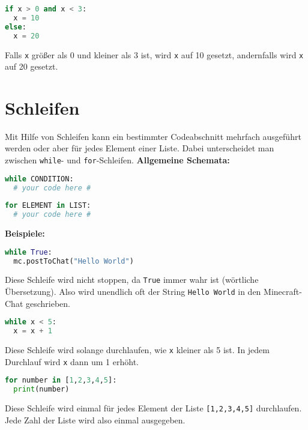 \documentclass{article}
\begin{document}
	\begin{lstlisting}[language=Python]
if x > 0 and x < 3:
  x = 10
else:
  x = 20
	\end{lstlisting}
	Falls \texttt{x} größer als 0 und kleiner als 3 ist, wird \texttt{x} auf 10 gesetzt, andernfalls wird \texttt{x} auf 20 gesetzt.
	
	\section{Schleifen}
	Mit Hilfe von Schleifen kann ein bestimmter Codeabschnitt mehrfach ausgeführt werden oder aber für jedes Element einer Liste. Dabei unterscheidet man zwischen \texttt{while}- und \texttt{for}-Schleifen.
	\newpage
	\textbf{Allgemeine Schemata:}
	\begin{lstlisting}[language=Python]
while CONDITION:
  # your code here #
	
for ELEMENT in LIST:
  # your code here #
	\end{lstlisting}
	\textbf{Beispiele:}
	\begin{lstlisting}[language=Python]
while True:
  mc.postToChat("Hello World")
	\end{lstlisting}
	Diese Schleife wird nicht stoppen, da \texttt{True} immer wahr ist (wörtliche Übersetzung). Also wird unendlich oft der String \texttt{Hello World} in den Minecraft-Chat geschrieben.\\
	
	\begin{lstlisting}[language=Python]
while x < 5:
  x = x + 1
	\end{lstlisting}
	Diese Schleife wird solange durchlaufen, wie \texttt{x} kleiner als 5 ist. In jedem Durchlauf wird \texttt{x} dann um 1 erhöht.\\

	\begin{lstlisting}[language=Python]
for number in [1,2,3,4,5]:
  print(number)
	\end{lstlisting}
	Diese Schleife wird einmal für jedes Element der Liste \texttt{[1,2,3,4,5]} durchlaufen. Jede Zahl der Liste wird also einmal ausgegeben.
\end{document}
